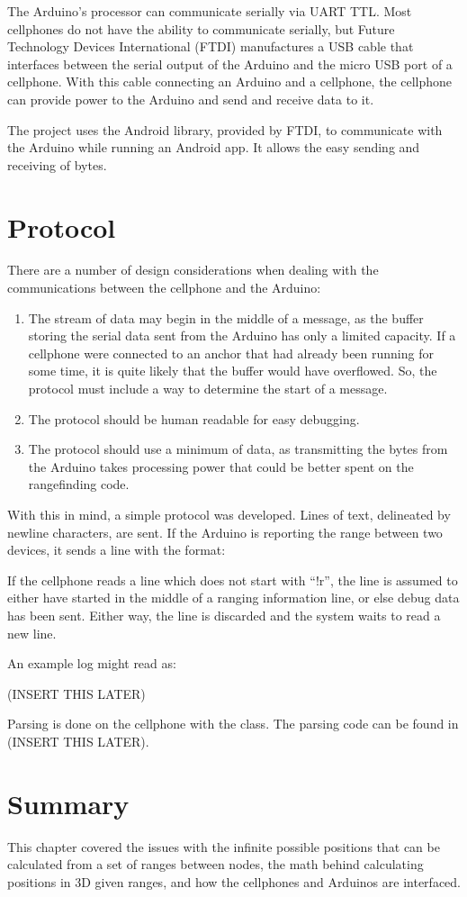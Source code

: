 The Arduino's processor can communicate serially via UART TTL. Most cellphones do not have the ability to communicate serially, but Future Technology Devices International (FTDI) manufactures a USB cable that interfaces between the serial output of the Arduino and the micro USB port of a cellphone. With this cable connecting an Arduino and a cellphone, the cellphone can provide power to the Arduino and send and receive data to it.

The project uses the Android  library, provided by FTDI, to communicate with the Arduino while running an Android app. It allows the easy sending and receiving of bytes. 

\section{Protocol}
There are a number of design considerations when dealing with the communications between the cellphone and the Arduino:
\begin{enumerate}
	\item The stream of data may begin in the middle of a message, as the buffer storing the serial data sent from the Arduino has only a limited capacity. If a cellphone were connected to an anchor that had already been running for some time, it is quite likely that the buffer would have overflowed. So, the protocol must include a way to determine the start of a message.
	\item The protocol should be human readable for easy debugging.
	\item The protocol should use a minimum of data, as transmitting the bytes from the Arduino takes processing power that could be better spent on the rangefinding code.
\end{enumerate}

With this in mind, a simple protocol was developed. Lines of text, delineated by newline characters, are sent. If the Arduino is reporting the range between two devices, it sends a line with the format:

\begin{center}
\end{center}

If the cellphone reads a line which does not start with ``!r'', the line is assumed to either have started in the middle of a ranging information line, or else debug data has been sent. Either way, the line is discarded and the system waits to read a new line.

An example log might read as:

(INSERT THIS LATER)

Parsing is done on the cellphone with the  class. The parsing code can be found in (INSERT THIS LATER).

\section{Summary}
This chapter covered the issues with the infinite possible positions that can be calculated from a set of ranges between nodes, the math behind calculating positions in 3D given ranges, and how the cellphones and Arduinos are interfaced.